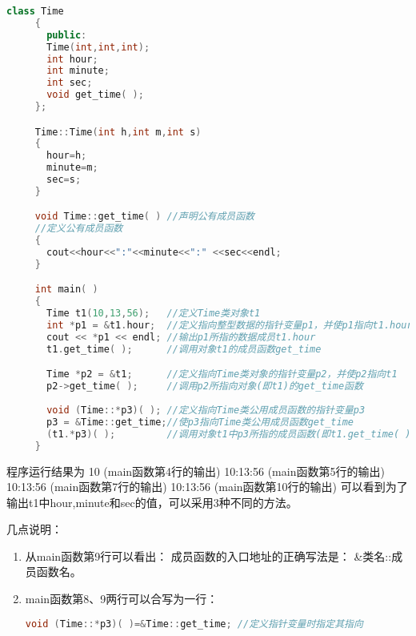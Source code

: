 \begin{enumerate}
\begin{lstlisting}[language=c++]
     class Time
     {
       public:
       Time(int,int,int);
       int hour;
       int minute;
       int sec;
       void get_time( );
     };

     Time::Time(int h,int m,int s)
     {
       hour=h;
       minute=m;
       sec=s;
     }

     void Time::get_time( ) //声明公有成员函数
     //定义公有成员函数
     {
       cout<<hour<<":"<<minute<<":" <<sec<<endl;
     }

     int main( )
     {
       Time t1(10,13,56);   //定义Time类对象t1
       int *p1 = &t1.hour;  //定义指向整型数据的指针变量p1，并使p1指向t1.hour
       cout << *p1 << endl; //输出p1所指的数据成员t1.hour
       t1.get_time( );      //调用对象t1的成员函数get_time

       Time *p2 = &t1;      //定义指向Time类对象的指针变量p2，并使p2指向t1
       p2->get_time( );     //调用p2所指向对象(即t1)的get_time函数
       
       void (Time::*p3)( ); //定义指向Time类公用成员函数的指针变量p3
       p3 = &Time::get_time;//使p3指向Time类公用成员函数get_time
       (t1.*p3)( );         //调用对象t1中p3所指的成员函数(即t1.get_time( ))
     }
   \end{lstlisting}

   程序运行结果为
   10 (main函数第4行的输出)
   10:13:56 (main函数第5行的输出)
   10:13:56 (main函数第7行的输出)
   10:13:56 (main函数第10行的输出)
   可以看到为了输出t1中hour,minute和sec的值，可以采用3种不同的方法。
 \end{enumerate}

 几点说明：
 \begin{enumerate}
   \itemsep=-3pt
 \item 从main函数第9行可以看出： 成员函数的入口地址的正确写法是： \&类名::成员函数名。
 \item main函数第8、9两行可以合写为一行：
   \begin{lstlisting}[language=c++]
     void (Time::*p3)( )=&Time::get_time; //定义指针变量时指定其指向
   \end{lstlisting}
 \end{enumerate}
